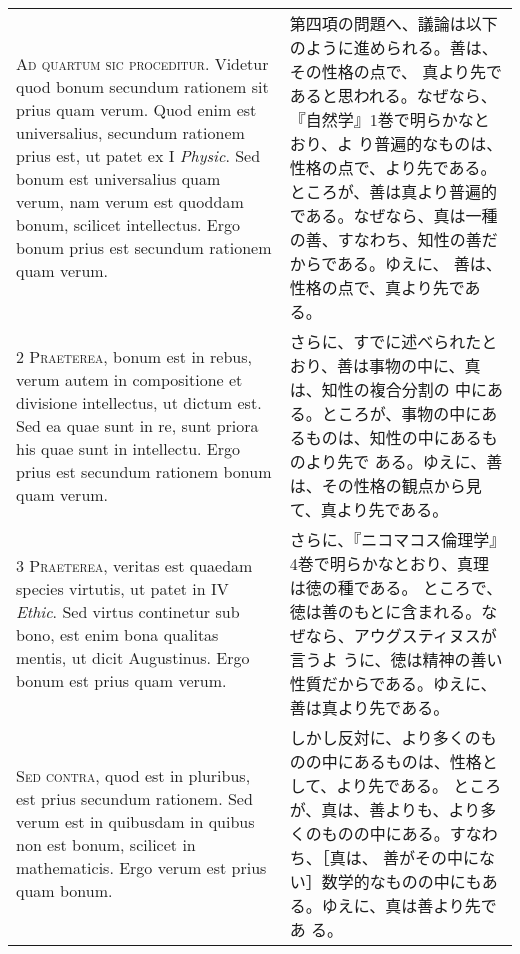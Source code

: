 \documentclass[10pt]{jsarticle} %
\begin{document}
\begin{longtable}{p{21em}p{21em}}

{\huge A}{\scshape d quartum sic proceditur}. Videtur quod bonum
secundum rationem sit prius quam verum. Quod enim est universalius,
secundum rationem prius est, ut patet ex I {\itshape Physic}. Sed
bonum est universalius quam verum, nam verum est quoddam bonum,
scilicet intellectus. Ergo bonum prius est secundum rationem quam
verum.

&

 第四項の問題へ、議論は以下のように進められる。善は、その性格の点で、
真より先であると思われる。なぜなら、『自然学』1巻で明らかなとおり、よ
り普遍的なものは、性格の点で、より先である。ところが、善は真より普遍的
である。なぜなら、真は一種の善、すなわち、知性の善だからである。ゆえに、
善は、性格の点で、真より先である。

\\


{\scshape 2 Praeterea}, bonum est in rebus, verum autem in
compositione et divisione intellectus, ut dictum est. Sed ea quae sunt
in re, sunt priora his quae sunt in intellectu. Ergo prius est
secundum rationem bonum quam verum.

&

さらに、すでに述べられたとおり、善は事物の中に、真は、知性の複合分割の
 中にある。ところが、事物の中にあるものは、知性の中にあるものより先で
 ある。ゆえに、善は、その性格の観点から見て、真より先である。

\\


{\scshape 3 Praeterea}, veritas est quaedam species virtutis, ut patet
in IV {\itshape Ethic}. Sed virtus continetur sub bono, est enim bona
qualitas mentis, ut dicit Augustinus. Ergo bonum est prius quam verum.

&


 さらに、『ニコマコス倫理学』4巻で明らかなとおり、真理は徳の種である。
 ところで、徳は善のもとに含まれる。なぜなら、アウグスティヌスが言うよ
 うに、徳は精神の善い性質だからである。ゆえに、善は真より先である。


\\


{\scshape Sed contra}, quod est in pluribus, est prius secundum
rationem. Sed verum est in quibusdam in quibus non est bonum, scilicet
in mathematicis. Ergo verum est prius quam bonum.

&

しかし反対に、より多くのものの中にあるものは、性格として、より先である。
 ところが、真は、善よりも、より多くのものの中にある。すなわち、［真は、
 善がその中にない］数学的なものの中にもある。ゆえに、真は善より先であ
 る。


\end{longtable}
\end{document}
